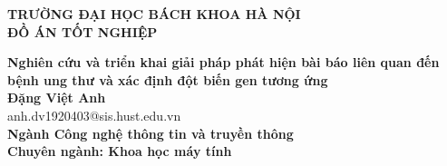 \documentclass[main.tex]{subfiles}
\begin{document}
\begin{titlepage}
\thispagestyle{empty}
\begin{center}

{\textbf{\large{TRƯỜNG ĐẠI HỌC BÁCH KHOA HÀ NỘI}}}\\[4cm]

{\textbf{\huge{ ĐỒ ÁN TỐT NGHIỆP}}}\\[1cm]
{\textbf{\Large{Nghiên cứu và triển khai giải pháp phát hiện bài báo liên quan đến bệnh ung thư và xác định đột biến gen tương ứng}}\\[1cm]

{\textbf{\large{Đặng Việt Anh}}}\\
{\large{anh.dv1920403@sis.hust.edu.vn}}\\[0.5cm]

{\textbf{\large{Ngành Công nghệ thông tin và truyền thông}}}\\
{\textbf{\large{Chuyên ngành: Khoa học máy tính}}}\\

\vspace{2cm}
\begin{table}[H]
\centering
{}
\end{table}}
\end{center}



\end{titlepage}
\end{document}
